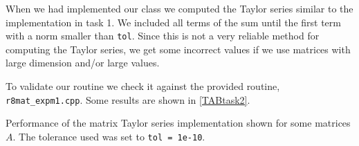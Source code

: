 \documentclass[a4paper,10pt]{article}
\begin{document}
When we had implemented our class we computed the Taylor series similar to the 
implementation in task 1. We included all terms of the sum until the 
first term with a norm smaller than \texttt{tol}. Since this is not a very reliable method for computing the Taylor series, we get some incorrect values if we use matrices with large dimension and/or large values.

To validate our routine we check it against the provided routine, \texttt{r8mat\_expm1.cpp}.
Some results are shown in \ref{TABtask2}.


\begin{table}[!ht]
\centering 
  \begin{minipage}[t]{105mm}
    \caption{
      Performance of the matrix Taylor series implementation shown for some matrices $A$. 
      The tolerance used was set to \texttt{tol = 1e-10}. 
    } 
    \label{TABtask2}
  \end{minipage}


\end{table}
\end{document}
